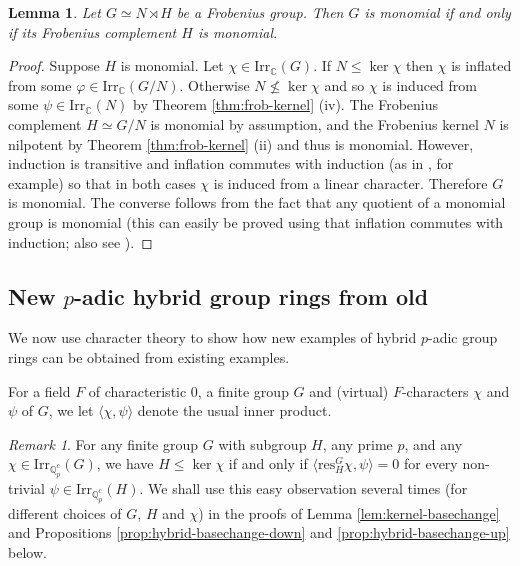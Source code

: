 \documentclass[12pt]{amsart}
\theoremstyle{plain}
\newtheorem{lemma}[theorem]{Lemma}
\theoremstyle{remark}
\newtheorem{remark}[theorem]{Remark}
\theoremstyle{definition}
\numberwithin{equation}{section}
\begin{document}
\begin{lemma}\label{lem:monomial-Frobenius}
Let $G \simeq N \rtimes H$ be a Frobenius group.
Then $G$ is monomial if and only if its Frobenius complement $H$ is monomial.
\end{lemma}

\begin{proof}
Suppose $H$ is monomial.
Let $\chi \in {\mathrm{Irr}}_{\mathbb{C}}(G)$.
If $N \leq \ker \chi$ then $\chi$ is inflated from some $\varphi \in {\mathrm{Irr}}_{\mathbb{C}}(G/N)$.
Otherwise $N \nleq \ker \chi$ and so $\chi$ is induced
from some $\psi \in {\mathrm{Irr}}_{\mathbb{C}}(N)$ by Theorem \ref{thm:frob-kernel} (iv).
The Frobenius complement $H \simeq G/N$ is monomial by assumption, and
the Frobenius kernel $N$ is nilpotent by Theorem \ref{thm:frob-kernel} (ii) and thus is monomial.
However, induction is transitive and inflation commutes with induction (as in \cite[Theorem 4.2 (3)]{MR1984740}, for example)
so that in both cases $\chi$ is induced from a linear character. Therefore $G$ is monomial.
The converse follows from the fact that any quotient of a monomial group is monomial
(this can easily be proved using that inflation commutes with induction; also see \cite[Chapter 2, \S 4]{MR655785}).
\end{proof}

\subsection{New $p$-adic hybrid group rings from old}
We now use character theory to show how new examples of hybrid $p$-adic group rings can be obtained from existing examples.

For a field $F$ of characteristic $0$, a finite group $G$ and (virtual) $F$-characters $\chi$ and $\psi$ of $G$,
we let $\langle \chi, \psi \rangle$ denote the usual inner product.

\begin{remark}
For any finite group $G$ with subgroup $H$, any prime $p$,
and any $\chi \in {\mathrm{Irr}}_{{\mathbb{Q}}_{p}^{c}}(G)$, we have $H \leq \ker\chi$ if and only if $\langle {\mathrm{res}}^{G}_{H} \chi, \psi \rangle = 0$
for every non-trivial $\psi \in {\mathrm{Irr}}_{{\mathbb{Q}}_{p}^{c}}(H)$. We shall use this easy observation several times (for different choices of
$G$, $H$ and $\chi$) in the proofs of Lemma \ref{lem:kernel-basechange} and Propositions \ref{prop:hybrid-basechange-down} and
\ref{prop:hybrid-basechange-up} below. 
\end{remark}
\end{document}
